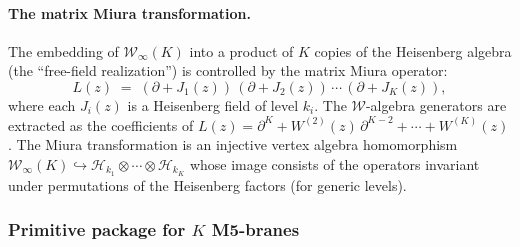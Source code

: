 \paragraph{The matrix Miura transformation.}
The embedding of $\mathcal{W}_\infty(K)$ into a product of $K$ copies of the
Heisenberg algebra (the ``free-field realization'') is controlled by the
matrix Miura operator:
\begin{equation}\label{eq:matrix-miura}
L(z)
\;=\;
(\partial + J_1(z))\,(\partial + J_2(z))\, \cdots\, (\partial + J_K(z)),
\end{equation}
where each $J_i(z)$ is a Heisenberg field of level $k_i$. The
$\mathcal{W}$-algebra generators are extracted as the coefficients of
$L(z) = \partial^K + W^{(2)}(z)\, \partial^{K-2} + \cdots + W^{(K)}(z)$.
The Miura transformation is an injective vertex algebra homomorphism
$\mathcal{W}_\infty(K) \hookrightarrow
\mathcal{H}_{k_1} \otimes \cdots \otimes \mathcal{H}_{k_K}$
whose image consists of the operators invariant under permutations of the
Heisenberg factors (for generic levels).

\subsubsection{Primitive package for $K$ M5-branes}

